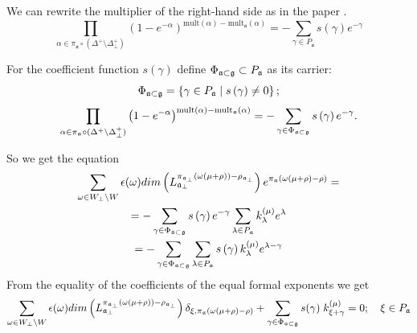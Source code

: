 \documentclass[a4paper,12pt]{article}
\theoremstyle{definition} \newtheorem{Def}{Definition}
\begin{document}
We can rewrite the multiplier of the right-hand side as in the paper \cite{ilyin812pbc}.
\begin{equation}
  \label{eq:11}
    \prod_{\alpha\in \pi_{\mathfrak{a}}\circ (\Delta^{+}\setminus \Delta^{+}_{\bot})} \left(1-e^{-\alpha}\right)^{\mathrm{mult}(\alpha)-\mathrm{mult}_{\mathfrak{a}}(\alpha)}=
     -\sum_{\gamma\in P_{\mathfrak{a}}} s(\gamma)e^{-\gamma}
\end{equation}

For the coefficient function $s\left( \gamma \right) $ define $\Phi _{\frak{a%
}\subset \frak{g}}\subset P_{\frak{a}}$ as its carrier:
\begin{equation}
\Phi _{\frak{a}\subset \frak{g}}=\left\{ \gamma \in P_{\frak{a}}\mid s\left(
\gamma \right) \neq 0\right\} ;  \label{phi-d}
\end{equation}
\begin{equation}
\prod_{\alpha\in \pi_{\mathfrak{a}}\circ (\Delta^{+}\setminus \Delta^{+}_{\bot})}\left(1-e^{-\alpha }\right) ^{\mathrm{{mult}\left( \alpha \right) -{mult}_{\frak{a}}}\mathrm{\left( \alpha \right) }}=-\sum_{\gamma \in \Phi _{\frak{a}\subset
\frak{g}}}s\left( \gamma \right) e^{-\gamma }.  \label{fan-d}
\end{equation}

So we get the equation
\begin{multline}
  \label{eq:16}
  \sum_{\omega\in W_{\bot}\backslash W} \epsilon(\omega) dim\left(L^{\pi_{\mathfrak{a}_{\bot}}(\omega(\mu+\rho))-\rho_{\mathfrak{a}_{\bot}}}_{\mathfrak{a}_{\bot}}\right) e^{\pi_{\mathfrak{a}}(\omega(\mu+\rho)-\rho)}=\\
  = -\sum_{\gamma \in \Phi _{\frak{a}\subset \frak{g}}} s\left( \gamma \right) e^{-\gamma }\sum_{\lambda \in P_{\frak{a}}}
  k_{\lambda }^{\left( \mu \right) }e^{\lambda } \\
  =-\sum_{\gamma \in \Phi _{\frak{a}\subset \frak{g}}}\sum_{\lambda \in P_{\frak{a}}}s\left( \gamma \right) k_{\lambda }^{\left( \mu \right)}e^{\lambda -\gamma }
\end{multline}
From the equality of the coefficients of the equal formal exponents we get
\begin{equation}
  \label{eq:17}
   \sum_{\omega\in W_{\bot}\backslash W} \epsilon(\omega) dim\left(L^{\pi_{\mathfrak{a}_{\bot}}(\omega(\mu+\rho))-\rho_{\mathfrak{a}_{\bot}}}_{\mathfrak{a}_{\bot}}\right) \delta_{\xi,\pi_{\mathfrak{a}}(\omega(\mu+\rho)-\rho)}+
   \sum_{\gamma \in \Phi _{\frak{a}\subset \frak{g}}} s(\gamma)\; k^{(\mu)}_{\xi+\gamma}=0;\quad \xi\in P_{\mathfrak{a}}
\end{equation}
\end{document}
